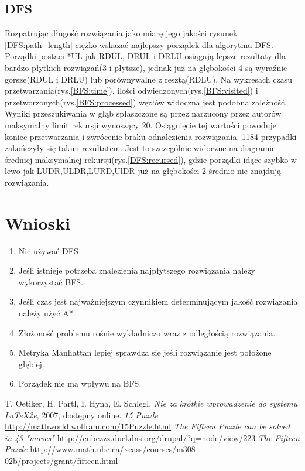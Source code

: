 \documentclass{classrep}
\begin{document}
\subsection{DFS}

Rozpatrując długość rozwiązania jako miarę jego jakości rysunek \ref{DFS:path_length} ciężko wskazać najlepszy porządek dla algorytmu DFS.
Porządki postaci *UL jak RDUL, DRUL i DRLU osiągają lepsze rezultaty dla bardzo płytkich rozwiązań(3 i płytsze), jednak już na głębokości 4 są wyraźnie gorsze(RDUL i DRLU) lub porównywalne z resztą(RDLU).
Na wykresach czasu przetwarzania(rys.\ref{BFS:time}), ilości odwiedzonych(rys.\ref{BFS:visited}) i przetworzonych(rys.\ref{BFS:processed}) węzłów widoczna jest podobna zależność.
Wyniki przeszukiwania w głąb spłaszczone są przez narzucony przez autorów maksymalny limit rekursji wynoszący 20.
Osiągnięcie tej wartości powoduje koniec przetwarzania i zwrócenie braku odnalezienia rozwiązania.
1184 przypadki zakończyły się takim rezultatem.
Jest to szczególnie widoczne na diagramie średniej maksymalnej rekursji(rys.\ref{DFS:recursed}), gdzie porządki idące szybko w lewo jak LUDR,ULDR,LURD,UlDR już na głębokości 2 średnio nie znajdują rozwiązania.

 


\section{Wnioski}
\begin{enumerate}
    \item Nie używać DFS
    \item Jeśli istnieje potrzeba znalezienia najpłytszego rozwiązania należy wykorzystać BFS.
    \item Jeśli czas jest najważniejszym czynnikiem determinującym jakość rozwiązania należy użyć A*.
    \item Złożoność problemu rośnie wykładniczo wraz z odległością rozwiązania.
    \item Metryka Manhattan lepiej sprawdza się jeśli rozwiązanie jest położone głębiej.
    \item Porządek nie ma wpływu na BFS.
\end{enumerate}

\begin{thebibliography}{0}
   T. Oetiker, H. Partl, I. Hyna, E. Schlegl.
    \textsl{Nie za krótkie wprowadzenie do systemu \LaTeX2e}, 2007, dostępny
    online.
   \textsl{15 Puzzle} \url{http://mathworld.wolfram.com/15Puzzle.html}
   \textsl{The Fifteen Puzzle can be solved in 43 "moves"} \url{http://cubezzz.duckdns.org/drupal/?q=node/view/223}
   \textsl{The Fifteen Puzzle} \url{http://www.math.ubc.ca/~cass/courses/m308-02b/projects/grant/fifteen.html}
\end{thebibliography}
\end{document}
